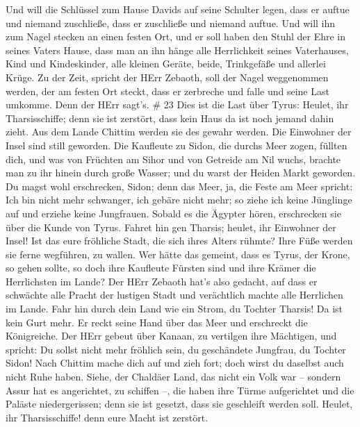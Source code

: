  Und will die Schlüssel zum Hause Davids auf seine Schulter
legen, dass er auftue und niemand zuschließe, dass er zuschließe und
niemand auftue.  Und will ihn zum Nagel stecken an einen
festen Ort, und er soll haben den Stuhl der Ehre in seines Vaters Hause,
 dass man an ihn hänge alle Herrlichkeit seines
Vaterhauses, Kind und Kindeskinder, alle kleinen Geräte, beide,
Trinkgefäße und allerlei Krüge.  Zu der Zeit, spricht der
HErr Zebaoth, soll der Nagel weggenommen werden, der am festen Ort
steckt, dass er zerbreche und falle und seine Last umkomme. Denn der
HErr sagt's. \# 23  Dies ist die Last über Tyrus: Heulet,
ihr Tharsisschiffe; denn sie ist zerstört, dass kein Haus da ist noch
jemand dahin zieht. Aus dem Lande Chittim werden sie des gewahr werden.
 Die Einwohner der Insel sind still geworden. Die Kaufleute
zu Sidon, die durchs Meer zogen, füllten dich,  und was von
Früchten am Sihor und von Getreide am Nil wuchs, brachte man zu ihr
hinein durch große Wasser; und du warst der Heiden Markt geworden.
 Du magst wohl erschrecken, Sidon; denn das Meer, ja, die
Feste am Meer spricht: Ich bin nicht mehr schwanger, ich gebäre nicht
mehr; so ziehe ich keine Jünglinge auf und erziehe keine Jungfrauen.
 Sobald es die Ägypter hören, erschrecken sie über die Kunde
von Tyrus.  Fahret hin gen Tharsis; heulet, ihr Einwohner
der Insel!  Ist das eure fröhliche Stadt, die sich ihres
Alters rühmte? Ihre Füße werden sie ferne wegführen, zu wallen.
 Wer hätte das gemeint, dass es Tyrus, der Krone, so gehen
sollte, so doch ihre Kaufleute Fürsten sind und ihre Krämer die
Herrlichsten im Lande?  Der HErr Zebaoth hat's also gedacht,
auf dass er schwächte alle Pracht der lustigen Stadt und verächtlich
machte alle Herrlichen im Lande.  Fahr hin durch dein Land
wie ein Strom, du Tochter Tharsis! Da ist kein Gurt mehr. 
Er reckt seine Hand über das Meer und erschreckt die Königreiche. Der
HErr gebeut über Kanaan, zu vertilgen ihre Mächtigen,  und
spricht: Du sollst nicht mehr fröhlich sein, du geschändete Jungfrau, du
Tochter Sidon! Nach Chittim mache dich auf und zieh fort; doch wirst du
daselbst auch nicht Ruhe haben.  Siehe, der Chaldäer Land,
das nicht ein Volk war -- sondern Assur hat es angerichtet, zu schiffen
--, die haben ihre Türme aufgerichtet und die Paläste niedergerissen;
denn sie ist gesetzt, dass sie geschleift werden soll. 
Heulet, ihr Tharsisschiffe! denn eure Macht ist zerstört. 
